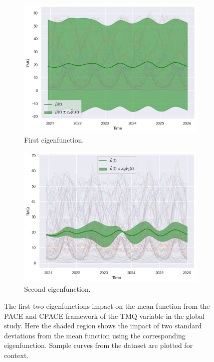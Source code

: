 \begin{figure}
	\centering
	\begin{subfigure}[b]{0.45\textwidth}
		\includegraphics[width=\textwidth]{phi_1_tmq_globe}
		\caption{First eigenfunction.}
		\label{fig:phi_1_tmq_globe}
	\end{subfigure}
	\hfill        
	\begin{subfigure}[b]{0.45\textwidth}
		\includegraphics[width=\textwidth]{phi_2_tmq_globe}
		\caption{Second eigenfunction.}
		\label{fig:phi_2_tmq_globe}
	\end{subfigure}
	\caption[The first two eigenfunctions impact on the mean function from the PACE and CPACE framework of the TMQ variable in the global study.]{The first two eigenfunctions impact on the mean function from the PACE and CPACE framework of the TMQ variable in the global study. Here the shaded region shows the impact of two standard deviations from the mean function using the corresponding eigenfunction. Sample curves from the dataset are plotted for context.}
	\label{fig:phi_tmq_globe}
\end{figure}

